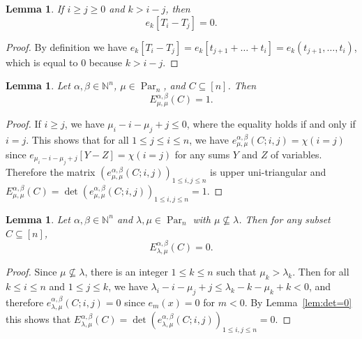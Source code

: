 \documentclass[12pt]{amsart}
\numberwithin{equation}{section}
\newtheorem{lem}[thm]{Lemma}
\theoremstyle{definition}
\newcommand\NN{\mathbb{N}}
\newcommand\Par{\operatorname{Par}}
\begin{document}
\begin{lem}\label{lem:e_k=0}
If $i\ge j\ge0$ and $k>i-j$, then 
\[
e_k[T_i-T_j] = 0.
\]
\end{lem}
\begin{proof}
  By definition we have $e_k[T_i-T_j] = e_k[t_{j+1}+\dots+t_i] =
  e_k(t_{j+1},\dots,t_i)$, which is equal to $0$ because $k > i-j$.
\end{proof}


\begin{lem}\label{lem:initial E}
  Let $\alpha,\beta\in\NN^n$, $\mu\in\Par_n$, and $C\subseteq[n]$. Then
\[
  E^{\alpha,\beta}_{\mu,\mu}(C) = 1.
\] 
\end{lem}
\begin{proof}
  If $i\ge j$, we have $\mu_i-i-\mu_j+j\le 0$, where the equality holds if and
  only if $i=j$. This shows that for all $1\le j\le i\le n$, we have
  $e^{\alpha,\beta}_{\mu,\mu}(C;i,j)= \chi(i=j)$ since
  $e_{\mu_i-i-\mu_j+j}[Y-Z]=\chi(i=j)$ for any sums $Y$ and $Z$ of variables.
  Therefore the matrix $(e^{\alpha,\beta}_{\mu,\mu}(C;i,j))_{1\le i,j\le n}$ is
  upper uni-triangular and $E^{\alpha,\beta}_{\mu,\mu}(C) =
  \det(e^{\alpha,\beta}_{\mu,\mu}(C;i,j))_{1\le i,j\le n}=1$.
\end{proof}


\begin{lem}\label{lem:E(C)=0}
  Let $\alpha,\beta\in\NN^n$ and $\lambda,\mu\in\Par_n$ with
  $\mu\not\subseteq\lambda$. Then for any subset $C\subseteq[n]$,
\[
  E^{\alpha,\beta}_{\lambda,\mu}(C) = 0.
\] 
\end{lem}
\begin{proof}
  Since $\mu\not\subseteq\lambda$, there is an integer $1\le k\le n$ such that
  $\mu_k>\lambda_k$. Then for all $k\le i\le n$ and $1\le j\le k$, we have
  $\lambda_i-i-\mu_j+j\le \lambda_k-k-\mu_k+k<0$, and therefore
  $e^{\alpha,\beta}_{\lambda,\mu}(C;i,j)=0$ since $e_{m}(x)=0$ for $m<0$. By
  Lemma~\ref{lem:det=0} this shows that $E^{\alpha,\beta}_{\lambda,\mu}(C) =
  \det(e^{\alpha,\beta}_{\lambda,\mu}(C;i,j))_{1\le i,j\le n}=0$.
\end{proof}
\end{document}
